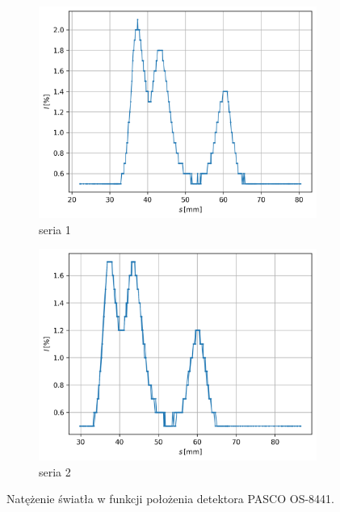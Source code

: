 \documentclass[12pt]{article}
\begin{document}
\begin{figure}[H]
  \centering
  \begin{subfigure}{0.45\textwidth}
    \includegraphics[width=\linewidth]{detektor0}
    \caption{seria 1}
    \label{fig:detektor_1}
  \end{subfigure}\hfill
  \begin{subfigure}{0.45\textwidth}
    \includegraphics[width=\linewidth]{detektor1}
    \caption{seria 2}
    \label{fig:detektor_2}
  \end{subfigure}
  \caption{Natężenie światła w funkcji położenia detektora PASCO OS-8441.}
  \label{fig:detektor}
\end{figure}
\end{document}
